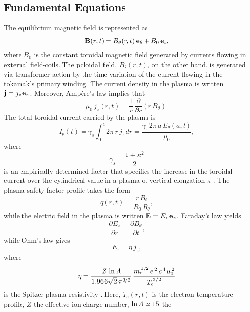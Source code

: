 \documentclass{iopjournal}
\begin{document}
\subsection{Fundamental Equations}
The equilibrium magnetic field is represented as
\begin{equation}
{\bf B}(r,t) = B_\theta(r,t)\,{\bf e}_\theta+ B_0\,{\bf e}_z,
\end{equation}
where $B_0$ is the constant toroidal magnetic field generated by  currents flowing in external  field-coils. The poloidal field, $B_\theta(r,t)$, on the other hand, is generated
via transformer action by the time variation of the current flowing in the tokamak's primary winding. The current density in the plasma is written ${\bf j}= j_z\,{\bf e}_z$. Moreover, Amp\`{e}re's law implies that
\begin{equation}
\mu_0\,j_z(r,t) = \frac{1}{r}\,\frac{\partial}{\partial r}(r\,B_\theta).
\end{equation}
The total toroidal current carried by the plasma is
\begin{equation}\label{ei}
I_p(t)= \gamma_s\int_0^a 2\pi\,r\,j_z\,dr = \frac{\gamma_s\,2\pi\,a\,B_\theta(a,t)}{\mu_0},
\end{equation}
where
\begin{equation}
\gamma_s = \frac{1+\kappa^2}{2}
\end{equation}
is an empirically determined factor that specifies the increase in the toroidal current over the cylindrical value in a plasma of vertical elongation $\kappa$ \cite{creely,uckam}.
The plasma safety-factor profile takes the form 
\begin{equation}
q(r,t) = \frac{r\,B_0}{R_0\,B_\theta},
\end{equation}
while the electric field in the plasma is written ${\bf E}= E_z\,{\bf e}_z$. Faraday's law yields
\begin{equation}
\frac{\partial E_z}{\partial r} = \frac{\partial B_\theta}{\partial t},
\end{equation}
while Ohm's law gives
\begin{equation}
E_z = \eta\,j_z,
\end{equation}
where
\begin{equation}
\eta = \frac{Z\,\ln{\mit\Lambda}}{1.96\,6\sqrt{2}\,\pi^{3/2}}\,\frac{m_e^{\,1/2}\,e^{\,2}\,c^{\,4}\,\mu_0^{\,2}}{T_e^{\,3/2}}
\end{equation}
is the Spitzer plasma resistivity \cite{spitzer,fitz}. Here, $T_e(r,t)$ is the electron temperature profile, $Z$ the effective ion charge number, $\ln{\mit\Lambda}\simeq 15$ the
\end{document}
